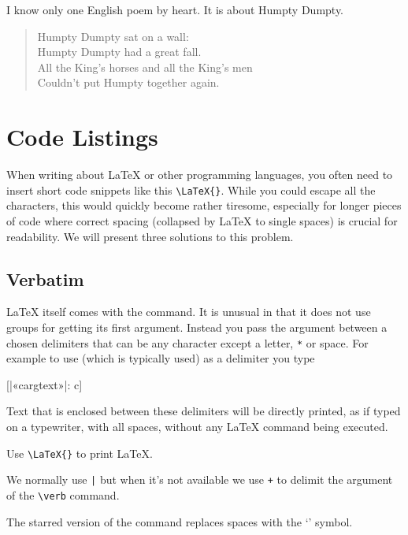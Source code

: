 \begin{example}
I know only one English
poem by heart. It is
about Humpty Dumpty.
\begin{verse}
  Humpty Dumpty sat
  on a wall:\\
  Humpty Dumpty had
  a great fall.\\
  All the King's horses
  and all the King's men\\
  Couldn't put Humpty
  together again.
\end{verse}
\end{example}

\section{Code Listings}

When writing about \LaTeX{} or other programming languages, you often need to
insert short code snippets like this \verb|\LaTeX{}|. While you could escape
all the characters, this would quickly become rather tiresome, especially for
longer pieces of code where correct spacing (collapsed by \LaTeX{} to single
spaces) is crucial for readability. We will present three solutions to this
problem.

\subsection{Verbatim}\label{sec:verbatim}

\LaTeX{} itself comes with the  command. It is unusual in that it does
not use groups for getting its first argument. Instead you pass the argument between a
chosen delimiters that can be any character except a letter, \verb|*| or
space. For example to use \cargv{|} (which is typically used) as a delimiter
you type
\begin{lscommand}
  [|«\bs carg{text}»|: c]
\end{lscommand}
Text that is enclosed between these delimiters will be directly printed, as if
typed on a typewriter, with all spaces, without any \LaTeX{} command being
executed.
\begin{example}
Use \verb|\LaTeX{}| to 
print \LaTeX.

We normally use \verb+|+ but
when it's not available we
use \verb|+| to delimit the
argument of the \verb|\verb|
command.
\end{example}

The starred version of the  command replaces spaces with the
\enquote*{\textvisiblespace{}} symbol.

